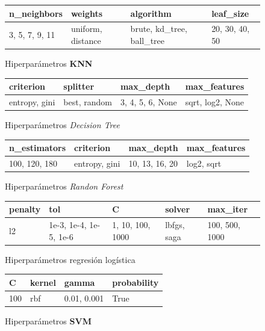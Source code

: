 			\begin{figure}[ht!]
				\centering
				\begin{tabular}{llll}
					\toprule
						   n\_neighbors &            weights &                  algorithm &       leaf\_size \\
					\midrule
					 3, 5, 7, 9, 11 &  uniform, distance &  brute, kd\_tree, ball\_tree &  20, 30, 40, 50 \\
					\bottomrule
				\end{tabular}
				\caption{Hiperparámetros \textbf{KNN}}
				\label{table:7}
			\end{figure}

			\begin{figure}[ht!]
				\centering
				\begin{tabular}{llll}
					\toprule
							criterion &        splitter &           max\_depth &      max\_features \\
					\midrule
					  entropy, gini &  best, random &  3, 4, 5, 6, None &  sqrt, log2, None \\
					\bottomrule
				\end{tabular}
				\caption{Hiperparámetros \emph{Decision Tree}}
				\label{table:8}
			\end{figure}
			
			\begin{figure}[ht!]
				\centering
				\begin{tabular}{llll}
					\toprule
					     n\_estimators &        criterion &          max\_depth &  max\_features \\
					\midrule
					  100, 120, 180 &  entropy, gini &  10,  13, 16, 20 &  log2, sqrt \\
					\bottomrule
				\end{tabular}
				\caption{Hiperparámetros \emph{Randon Forest}}
				\label{table:9}
			\end{figure}

			\begin{figure}[ht!]
				\centering
				\begin{tabular}{lllll}
					\toprule
					 penalty &                       tol &                   C &         solver &        max\_iter \\
					\midrule
					    l2 &  1e-3, 1e-4, 1e-5, 1e-6 &  1, 10, 100, 1000 &  lbfgs, saga &  100, 500, 1000 \\
					\bottomrule
				\end{tabular}
				\caption{Hiperparámetros regresión logística}
				\label{table:10}
			\end{figure}
			\newpage

			\begin{figure}[ht!]
				\centering
				\begin{tabular}{llll}
					\toprule
					      C & kernel &          gamma &  probability \\
					\midrule
					  100 &  rbf &  0.01, 0.001 &         True \\
					\bottomrule
				\end{tabular}
				\caption{Hiperparámetros \textbf{SVM}}
				\label{table:11}
			\end{figure}
